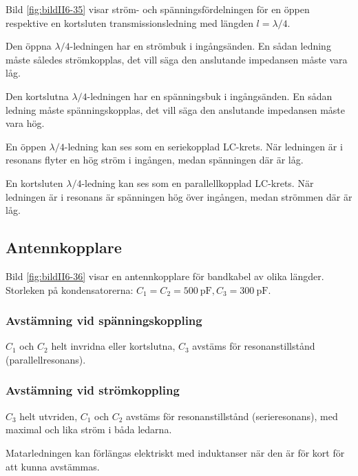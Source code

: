 
Bild \ref{fig:bildII6-35} visar ström- och spänningsfördelningen för en öppen
respektive en kortsluten transmissionsledning med längden \(l = \lambda/4\).

Den öppna \(\lambda/4\)-ledningen har en strömbuk i ingångsänden.
En sådan ledning måste således strömkopplas, det vill säga den anslutande
impedansen måste vara låg.

Den kortslutna \(\lambda/4\)-ledningen har en spänningsbuk i ingångsänden.
En sådan ledning måste spänningskopplas, det vill säga den anslutande
impedansen måste vara hög.

En öppen \(\lambda/4\)-ledning kan ses som en seriekopplad LC-krets.
När ledningen är i resonans flyter en hög ström i ingången, medan spänningen
där är låg.

En kortsluten \(\lambda/4\)-ledning kan ses som en parallellkopplad LC-krets.
När ledningen är i resonans är spänningen hög över ingången, medan strömmen där
är låg.

\subsection{Antennkopplare}

Bild \ref{fig:bildII6-36} visar en antennkopplare för bandkabel av olika
längder.
Storleken på kondensatorerna: \(C_1 = C_2 = \SI{500}{\pico\farad}, C_3 =
\SI{300}{\pico\farad}\).

\subsubsection{Avstämning vid spänningskoppling}

\(C_1\) och \(C_2\) helt invridna eller kortslutna, \(C_3\) avstäms
för resonanstillstånd (parallellresonans).

\subsubsection{Avstämning vid strömkoppling}

\(C_3\) helt utvriden, \(C_1\) och \(C_2\) avstäms för
resonanstillstånd (serieresonans), med maximal och lika ström i båda ledarna.

Matarledningen kan förlängas elektriskt med induktanser när den är för
kort för att kunna avstämmas.


